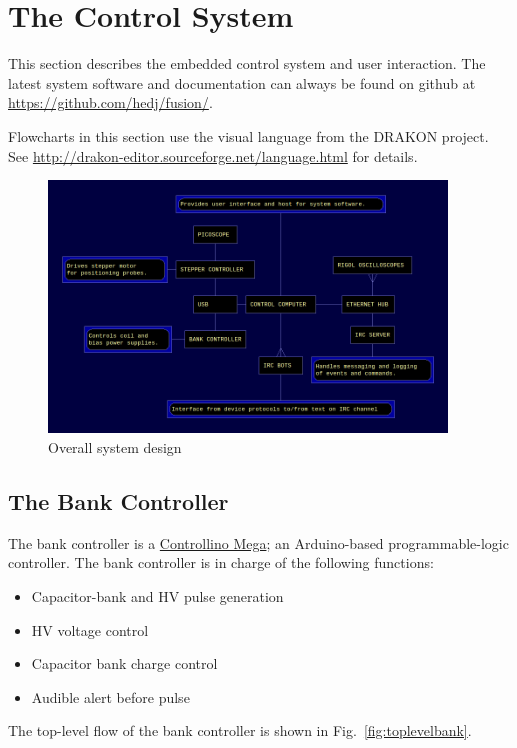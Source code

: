 
\section{The Control System}

This section describes the embedded control system and user interaction.
The latest system software and documentation can always be found on github at \url{https://github.com/hedj/fusion/}.

Flowcharts in this section use the visual language from the DRAKON project. See \url{http://drakon-editor.sourceforge.net/language.html} for details.

\begin{figure}
  \includegraphics[width=400px]{system_structure.png}
\caption{\label{fig:system} Overall system design}
\end{figure}

\subsection{The Bank Controller}

The bank controller is a \href{http://controllino.biz/product/controllino-mega/}{Controllino Mega}; an
Arduino-based programmable-logic controller. The bank controller is in charge of the following functions:
\begin{itemize}
  \item{Capacitor-bank and HV pulse generation}
  \item{HV voltage control}
  \item{Capacitor bank charge control}
  \item{Audible alert before pulse}
\end{itemize}

The top-level flow of the bank controller is shown in Fig.~\ref{fig:toplevelbank}.

